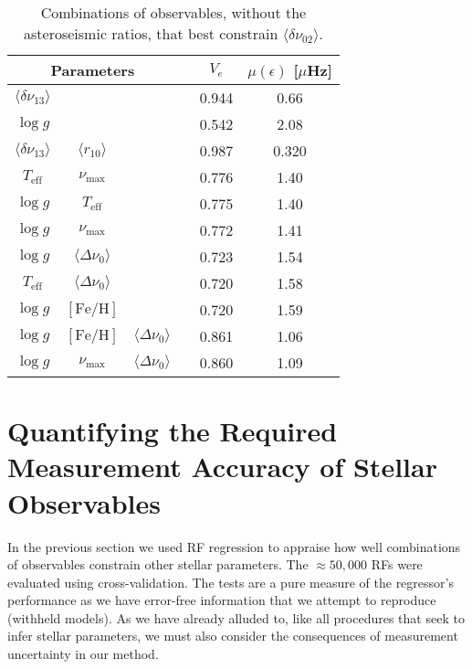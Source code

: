 \begin{table}
\centering
\caption{Combinations of observables, without the asteroseismic ratios, that best constrain $\langle\delta\nu_{02}\rangle$.}
    \begin{tabular}{cccccc}
    \hline
\multicolumn{3}{c}{Parameters} && $V_e$ & $\mu (\epsilon)$ [$\mu$Hz] \\ \hline \hline
$\langle\delta\nu_{13}\rangle$ &  &   &&0.944 & 0.66 \\ 
$\log{} g$ &  &   &&0.542 & 2.08 \\ 
$\langle\delta\nu_{13}\rangle$ &  $\langle r_{10}\rangle$  &   &&0.987 & 0.320 \\ 
$T_{\text{eff}}$     & $\nu_{\max}$&     &&0.776  & 1.40\\
$\log{} g$     &  $T_{\text{eff}}$&                 & &0.775  & 1.40\\
$\log{} g$     &$\nu_{\max}$ &               &&0.772  & 1.41\\
$\log{} g$     &$\langle\Delta\nu_0\rangle$ &               &&0.723  & 1.54\\
$T_{\text{eff}}$     & $\langle\Delta\nu_0\rangle$&     &&0.720  & 1.58\\
$\log{} g$ & $[\text{Fe/H}]$ &  && 0.720 & 1.59 \\
$\log{} g$ & $[\text{Fe/H}]$ & $\langle\Delta\nu_0\rangle$ && 0.861 & 1.06 \\
$\log{} g$ & $\nu_{\max}$ & $\langle\Delta\nu_0\rangle$ && 0.860 & 1.09 \\
\hline
    \end{tabular}
    \label{tab:d02}
\end{table}




\section[Quantifying the Required Measurement Accuracy]{Quantifying the Required Measurement Accuracy of Stellar Observables}
\label{sec:accu}
In the previous section we used RF regression to appraise how well combinations of observables constrain other stellar parameters. The ${\approx 50,000}$ RFs were   
evaluated using cross-validation. The tests are a pure measure of the regressor's performance as we have error-free information that we attempt to reproduce (withheld models).
 As we have already alluded to, like all procedures that seek to infer stellar parameters, we must also consider the consequences of measurement uncertainty in our method. 

